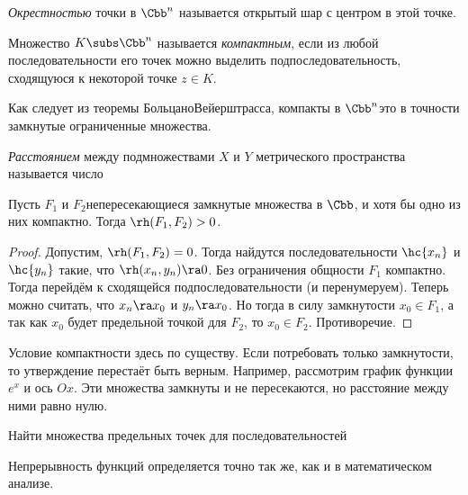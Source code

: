 \documentclass[a4paper]{article}
\begin{document}
\begin{df}
\emph{Окрестностью} точки в $\Cbb^n$ называется открытый шар с центром в этой точке.
\end{df}

\begin{df}
Множество $K\subs \Cbb^n$ называется \emph{компактным}, если из любой последовательности
его точек можно выделить подпоследовательность, сходящуюся к некоторой точке $z \in K$.
\end{df}

Как следует из теоремы Больцано\ч Вейерштрасса, компакты в $\Cbb^n$\т это в точности замкнутые ограниченные множества.

\begin{df}
\emph{Расстоянием} между подмножествами $X$ и $Y$ метрического пространства называется число
\end{df}

\begin{stm}
Пусть $F_1$ и $F_2$\т непересекающиеся замкнутые множества в $\Cbb$, и хотя бы одно из них компактно.
Тогда $\rh(F_1, F_2) > 0$.
\end{stm}
\begin{proof}
Допустим, $\rh(F_1,F_2)=0$. Тогда найдутся последовательности $\hc{x_n}$ и $\hc{y_n}$ такие, что $\rh(x_n,y_n)\ra 0$.
Без ограничения общности $F_1$ компактно. Тогда перейдём к сходящейся подпоследовательности (и перенумеруем).
Теперь можно считать, что $x_n\ra x_0$ и $y_n\ra x_0$. Но тогда в силу замкнутости $x_0\in F_1$, а так как $x_0$ будет
предельной точкой для $F_2$, то $x_0\in F_2$. Противоречие.
\end{proof}

\begin{note}
Условие компактности здесь по существу. Если потребовать только замкнутости, то утверждение перестаёт быть верным.
Например, рассмотрим график функции $e^x$ и ось $Ox$. Эти множества замкнуты и не пересекаются, но расстояние
между ними равно нулю.
\end{note}

\begin{problem}
Найти множества предельных точек для последовательностей
\end{problem}

Непрерывность функций определяется точно так же, как и в математическом анализе.
\end{document}
